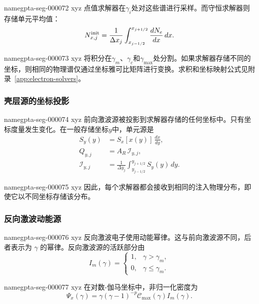 \documentclass[twocolumn]{aastex702}
\makeatletter
\providecommand{\gptareaderanchor}[1]{\pdfdest name{#1} xyz}%
\providecommand{\gptareaderanchor}[1]{\special{pdf:dest (#1) [ @thispage /XYZ @xpos @ypos null ]}}%
\makeatother
\begin{document}
\gptareaderanchor{gpta-seg-000072}%
点值求解器在\(\gamma_i\)处对这些谱进行采样。而守恒求解器则存储单元平均值：
\begin{equation}
N_{x,j}^{\rm init}=\frac{1}{\Delta x_j}
\int_{x_{j-1/2}}^{x_{j+1/2}}
\frac{dN_e}{dx}\,dx .
\end{equation}

\gptareaderanchor{gpta-seg-000073}%
将积分在\(\gamma_m\)、\(\gamma_c\)和\(\gamma_{\max}\)处分割。如果求解器存储不同的坐标，则相同的物理谱仅通过坐标雅可比矩阵进行变换。求积和坐标映射公式见附录~\ref{app:electron-solvers}。

\subsubsection{壳层源的坐标投影}


\gptareaderanchor{gpta-seg-000074}%
前向激波源被投影到求解器存储的任何坐标中。只有坐标度量发生变化。在一般存储坐标\(y\)中，单元源是
\begin{equation}
\begin{aligned}
S_y(y)&=S_x[x(y)]\,\frac{dx}{dy},\\
Q_{y,j}
&=A_R\,\mathcal I_{y,j},\\
\mathcal I_{y,j}
&=\frac{1}{\Delta y_j}
\int_{y_{j-1/2}}^{y_{j+1/2}}
S_y(y)\,dy .
\end{aligned}
\end{equation}

\gptareaderanchor{gpta-seg-000075}%
因此，每个求解器都会接收到相同的注入物理分布，即使它以不同坐标存储该分布。

\subsubsection{反向激波动能源}


\gptareaderanchor{gpta-seg-000076}%
反向激波电子使用动能幂律。这与前向激波源不同，后者表示为 \(\gamma\) 的幂律。反向激波源的活跃部分由
\begin{equation}
I_m(\gamma)=
\begin{cases}
1, & \gamma>\gamma_m,\\
0, & \gamma\le\gamma_m .
\end{cases}
\end{equation}

\gptareaderanchor{gpta-seg-000077}%
在对数-伽马坐标中，非归一化密度为
\begin{equation}
\Psi_x(\gamma)=\gamma(\gamma-1)^{-p}
\mathcal{C}_{\max}(\gamma)I_m(\gamma).
\end{equation}
\end{document}
